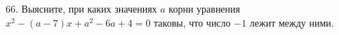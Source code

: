 66. Выясните, при каких значениях $a$ корни уравнения $x^2-(a-7)x+a^2-6a+4=0$ таковы, что число $-1$ лежит между ними.\\
